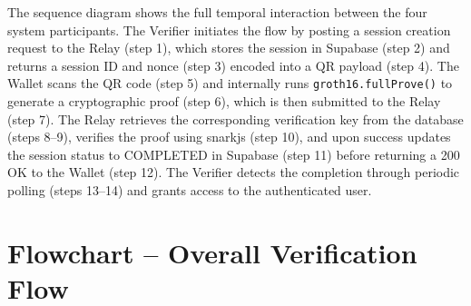 \vspace{0.4cm}
The sequence diagram shows the full temporal interaction between the four system participants. The Verifier initiates the flow by posting a session creation request to the Relay (step 1), which stores the session in Supabase (step 2) and returns a session ID and nonce (step 3) encoded into a QR payload (step 4). The Wallet scans the QR code (step 5) and internally runs \texttt{groth16.fullProve()} to generate a cryptographic proof (step 6), which is then submitted to the Relay (step 7). The Relay retrieves the corresponding verification key from the database (steps 8--9), verifies the proof using snarkjs (step 10), and upon success updates the session status to COMPLETED in Supabase (step 11) before returning a 200 OK to the Wallet (step 12). The Verifier detects the completion through periodic polling (steps 13--14) and grants access to the authenticated user.

\newpage
\section{Flowchart -- Overall Verification Flow}

